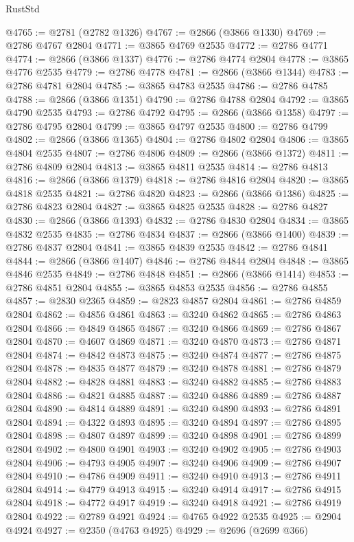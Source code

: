 \begin{lexlean}{RustStd}
\begin{coremodule}
@4765 := @2781 (@2782 @1326)
@4767 := @2866 (@3866 @1330)
@4769 := @2786 @4767 @2804
@4771 := @3865 @4769 @2535
@4772 := @2786 @4771
@4774 := @2866 (@3866 @1337)
@4776 := @2786 @4774 @2804
@4778 := @3865 @4776 @2535
@4779 := @2786 @4778
@4781 := @2866 (@3866 @1344)
@4783 := @2786 @4781 @2804
@4785 := @3865 @4783 @2535
@4786 := @2786 @4785
@4788 := @2866 (@3866 @1351)
@4790 := @2786 @4788 @2804
@4792 := @3865 @4790 @2535
@4793 := @2786 @4792
@4795 := @2866 (@3866 @1358)
@4797 := @2786 @4795 @2804
@4799 := @3865 @4797 @2535
@4800 := @2786 @4799
@4802 := @2866 (@3866 @1365)
@4804 := @2786 @4802 @2804
@4806 := @3865 @4804 @2535
@4807 := @2786 @4806
@4809 := @2866 (@3866 @1372)
@4811 := @2786 @4809 @2804
@4813 := @3865 @4811 @2535
@4814 := @2786 @4813
@4816 := @2866 (@3866 @1379)
@4818 := @2786 @4816 @2804
@4820 := @3865 @4818 @2535
@4821 := @2786 @4820
@4823 := @2866 (@3866 @1386)
@4825 := @2786 @4823 @2804
@4827 := @3865 @4825 @2535
@4828 := @2786 @4827
@4830 := @2866 (@3866 @1393)
@4832 := @2786 @4830 @2804
@4834 := @3865 @4832 @2535
@4835 := @2786 @4834
@4837 := @2866 (@3866 @1400)
@4839 := @2786 @4837 @2804
@4841 := @3865 @4839 @2535
@4842 := @2786 @4841
@4844 := @2866 (@3866 @1407)
@4846 := @2786 @4844 @2804
@4848 := @3865 @4846 @2535
@4849 := @2786 @4848
@4851 := @2866 (@3866 @1414)
@4853 := @2786 @4851 @2804
@4855 := @3865 @4853 @2535
@4856 := @2786 @4855
@4857 := @2830 @2365
@4859 := @2823 @4857 @2804
@4861 := @2786 @4859 @2804
@4862 := @4856 @4861
@4863 := @3240 @4862
@4865 := @2786 @4863 @2804
@4866 := @4849 @4865
@4867 := @3240 @4866
@4869 := @2786 @4867 @2804
@4870 := @4607 @4869
@4871 := @3240 @4870
@4873 := @2786 @4871 @2804
@4874 := @4842 @4873
@4875 := @3240 @4874
@4877 := @2786 @4875 @2804
@4878 := @4835 @4877
@4879 := @3240 @4878
@4881 := @2786 @4879 @2804
@4882 := @4828 @4881
@4883 := @3240 @4882
@4885 := @2786 @4883 @2804
@4886 := @4821 @4885
@4887 := @3240 @4886
@4889 := @2786 @4887 @2804
@4890 := @4814 @4889
@4891 := @3240 @4890
@4893 := @2786 @4891 @2804
@4894 := @4322 @4893
@4895 := @3240 @4894
@4897 := @2786 @4895 @2804
@4898 := @4807 @4897
@4899 := @3240 @4898
@4901 := @2786 @4899 @2804
@4902 := @4800 @4901
@4903 := @3240 @4902
@4905 := @2786 @4903 @2804
@4906 := @4793 @4905
@4907 := @3240 @4906
@4909 := @2786 @4907 @2804
@4910 := @4786 @4909
@4911 := @3240 @4910
@4913 := @2786 @4911 @2804
@4914 := @4779 @4913
@4915 := @3240 @4914
@4917 := @2786 @4915 @2804
@4918 := @4772 @4917
@4919 := @3240 @4918
@4921 := @2786 @4919 @2804
@4922 := @2789 @4921
@4924 := @4765 @4922 @2535
@4925 := @2904 @4924
@4927 := @2350 (@4763 @4925)
@4929 := @2696 (@2699 @366)

\end{coremodule}
\end{lexlean}
